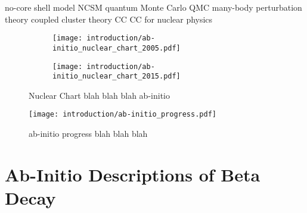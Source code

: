 \documentclass[../thesis.tex]{subfiles}
\begin{document}
no-core shell model NCSM \cite{NAVRATIL2000054311,NAVRATIL2009083101,BARRETT2013131}
quantum Monte Carlo QMC \cite{PUDLINER19971720,PIEPER200153,CARLSON20151067}
many-body perturbation theory \cite{HUBBARD1957539,HUGENHOLTZ1957481,SCHAEFER1984,SHAVITT2009}
coupled cluster theory CC \cite{CIZEK19664256,CIZEK1971359,CIZEK1980251,PIECUCH2002527,SHAVITT2009}
CC for nuclear physics \cite{COESTER1958421,COESTER1960477,KUMMEL19781}

\begin{figure}
  \centering
  \begin{subfigure}{\textwidth}
    \centering
    \texttt{[image: introduction/ab-initio\_nuclear\_chart\_2005.pdf]}
  \end{subfigure}
  
  \begin{subfigure}{\textwidth}
    \centering
    \texttt{[image: introduction/ab-initio\_nuclear\_chart\_2015.pdf]}
  \end{subfigure}
  \caption{Nuclear Chart blah blah blah ab-initio}
  \label{fig:AbInitioChart}
\end{figure}

\begin{figure}
  \centering
  \texttt{[image: introduction/ab-initio\_progress.pdf]}
  \caption{ab-initio progress blah blah blah}
  \label{fig:AbInitioProgress}
\end{figure}

\section{Ab-Initio Descriptions of Beta Decay}
\end{document}

